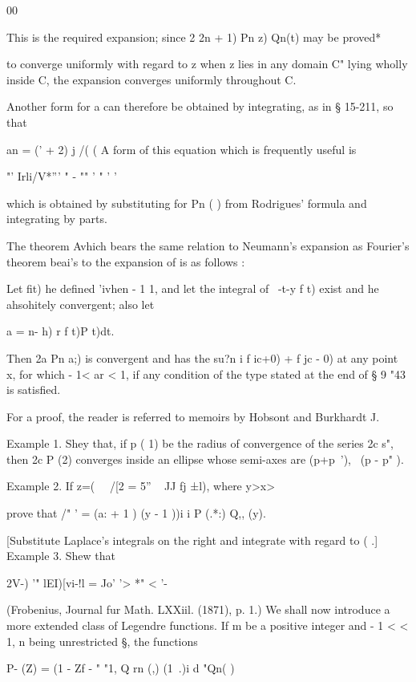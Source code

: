 {{{%
%

00

This is the required expansion; since 2 2n + 1) Pn z) Qn(t) may be
proved*

to converge uniformly with regard to z when z lies in any domain C"
lying wholly inside C, the expansion converges uniformly throughout C.

Another form for a can therefore be obtained by integrating, as in §
15-211, so that

an = (' + 2) j /( (  A form of this equation which is frequently
useful is

"' Irli/V*''' " - "" ' " ' '

which is obtained by substituting for Pn ( ) from Rodrigues' formula
and integrating by parts.

The theorem Avhich bears the same relation to Neumann's expansion as
Fourier's theorem beai's to the expansion of is as follows :

Let fit) he defined 'ivhen - 1 1, and let the integral of \ -t-y f t)
exist and he ahsohitely convergent; also let

a = n- h) r f t)P t)dt.

Then 2a Pn a;) is convergent and has the su?n i f ic+0) + f jc - 0) at
any point x, for which - 1< ar < 1, if any condition of the type
stated at the end of § 9 "43 is satisfied.

For a proof, the reader is referred to memoirs by Hobsont and
Burkhardt J.

Example 1. Shey that, if p ( 1) be the radius of convergence of the
series 2c s", then 2c P (2) converges inside an ellipse whose
semi-axes are (p+p~'), \ (p - p" ).

Example 2. If z=( \ \ /[2 = 5'' ~ JJ fj ±l), where y>x>\,

prove that /" ' = (a: + 1 ) (y - 1 ))i i P (.*:) Q,, (y).

[Substitute Laplace's integrals on the right and integrate with regard
to ( .] Example 3. Shew that

2V-) '" lEI)[vi-!l = Jo' '>  *" < '-

(Frobenius, Journal fur Math. LXXiil. (1871), p. 1.)
 We shall now
introduce a more extended class of Legendre functions. If m be a
positive integer and - 1 < < 1, n being unrestricted §, the functions

P- (Z) = (1 - Zf - " "1, Q rn (,) (1 \,.)i d "Qn( )

}}}
